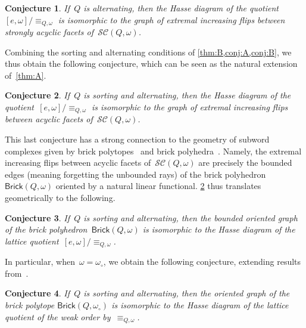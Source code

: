 \documentclass[reqno]{amsart}
\newtheorem{conjectureA}{Conjecture}
\theoremstyle{definition}
\newcommand{\wo}{\omega_\circ} %
\newcommand{\subwordComplex}{\mathcal{SC}} %
\newcommand{\brickPolyhedron}{\mathsf{Brick}} %
\begin{document}
\begin{conjectureA}
\label{conj:B}
If~$Q$ is alternating, then the Hasse diagram of the quotient~$[e, \omega]/\equiv_{Q, \omega}$ is isomorphic to the graph of extremal increasing flips between strongly acyclic facets of~$\subwordComplex(Q, \omega)$.
\end{conjectureA}

Combining the sorting and alternating conditions of \cref{thm:B,conj:A,conj:B}, we thus obtain the following conjecture, which can be seen as the natural extension of~\cref{thm:A}.

\begin{conjectureA}
\label{conj:C}
If~$Q$ is sorting and alternating, then the Hasse diagram of the quotient~$[e, \omega]/\equiv_{Q, \omega}$ is isomorphic to the graph of extremal increasing flips between acyclic facets of~$\subwordComplex(Q, \omega)$.
\end{conjectureA}

This last conjecture has a strong connection to the geometry of subword complexes given by brick polytopes~\cite{PilaudSantos-brickPolytope, PilaudStump-brickPolytope} and brick polyhedra~\cite{JahnStump}.
Namely, the extremal increasing flips between acyclic facets of~$\subwordComplex(Q, \omega)$ are precisely the bounded edges (meaning forgetting the unbounded rays) of the brick polyhedron~$\brickPolyhedron(Q, \omega)$ oriented by a natural linear functional.
\cref{conj:C} thus translates geometrically to the following.

\begin{conjectureA}
\label{conj:D}
If~$Q$ is sorting and alternating, then the bounded oriented graph of the brick polyhedron~$\brickPolyhedron(Q, \omega)$ is isomorphic to the Hasse diagram of the lattice quotient~$[e, \omega]/\equiv_{Q, \omega}$.
\end{conjectureA}

In particular, when~$\omega = \wo$, we obtain the following conjecture, extending results from~\cite{Pilaud-brickAlgebra}.

\begin{conjectureA}
\label{conj:E}
If~$Q$ is sorting and alternating, then the oriented graph of the brick polytope $\brickPolyhedron(Q, \wo)$ is isomorphic to the Hasse diagram of the lattice quotient of the weak order by~$\equiv_{Q, \omega}$.
\end{conjectureA}

\end{document}
